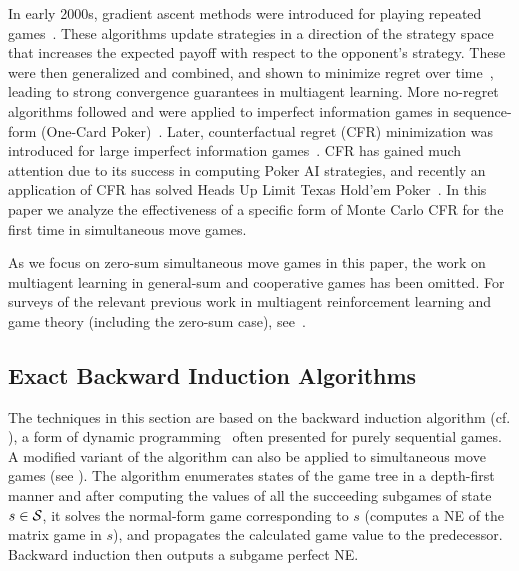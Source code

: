 In early 2000s, gradient ascent methods were introduced for playing 
repeated games~\cite{Singh02Nash,Bowling01WoLF}. These algorithms update strategies in a direction of the strategy space 
that increases the expected payoff with respect to the opponent's strategy. These were then generalized and combined, and 
shown to minimize regret over time~\cite{Zinkevich03Online,Bowling05Convergence}, leading to strong convergence 
guarantees in multiagent learning. More no-regret algorithms followed and were applied to imperfect information 
games in sequence-form (One-Card Poker)~\cite{Gordon06No}. Later, counterfactual regret (CFR) minimization was 
introduced for large imperfect information games~\cite{CFR}. CFR has gained much attention due to its success in 
computing Poker AI strategies, and recently an application of CFR has solved Heads Up Limit Texas Hold'em Poker~\cite{Bowling15science}.
In this paper we analyze the effectiveness of a specific form of Monte Carlo CFR for the first time in simultaneous move games. 

As we focus on zero-sum simultaneous move games in this paper, the work on multiagent learning in general-sum and 
cooperative games has been omitted. For surveys of the relevant previous work in multiagent 
reinforcement learning and game theory (including the zero-sum case), 
see~\cite{Nowe12MARLchapter,Busoniu08Comprehensive,Bloembergen15Evolutionary}.

\subsection{Exact Backward Induction Algorithms}

The techniques in this section are based on the backward induction algorithm (cf. \cite{Shoham09}), 
a form of dynamic programming~\cite{Bellman57} often presented for purely sequential games. 
A modified variant of the algorithm can also be applied to simultaneous move 
games (\eg see \cite{Ross71Goofspiel,buro2003,Rhoads12Computer}). 
The algorithm enumerates states of the game tree in a depth-first manner and after computing the values of all the succeeding subgames of state $s \in \mathcal{S}$, 
it solves the normal-form game corresponding to $s$ (\ie computes a NE of the matrix game in $s$), and propagates the calculated game value to the predecessor.
Backward induction then outputs a subgame perfect NE. 

